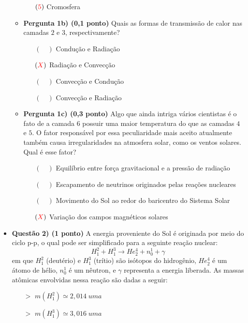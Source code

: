 \documentclass[a4paper, 12pt]{article}
\newcommand{\red}[1]{\textcolor{red}{#1}}
\begin{document}
\begin{flushleft}
\begin{itemize}
\begin{itemize}
\begin{multicols}{2}
\begin{itemize}
						\item[$(\red{5})$] Cromosfera
					\end{itemize} \end{multicols}
				\item \textbf{Pergunta 1b) (0,1 ponto)} Quais as formas de transmissão de calor nas camadas $2$ e $3$, respectivamente?
					\begin{itemize}
						\item[$(\quad)$] Condução e Radiação
						\item[$(\red{X})$] Radiação e Convecção
						\item[$(\quad)$] Convecção e Condução
						\item[$(\quad)$] Convecção e Radiação
					\end{itemize}
				\item \textbf{Pergunta 1c) (0,3 ponto)} Algo que ainda intriga vários cientistas é o fato de a camada $6$ possuir uma maior temperatura do que as camadas $4$ e $5$. O fator responsável por essa peculiaridade mais aceito atualmente também causa irregularidades na atmosfera solar, como os ventos solares. Qual é esse fator?
					\begin{itemize}
						\item[$(\quad)$] Equilíbrio entre força gravitacional e a pressão de radiação
						\item[$(\quad)$] Escapamento de neutrinos originados pelas reações nucleares
						\item[$(\quad)$] Movimento do Sol ao redor do baricentro do Sistema Solar
						\item[$(\red{X})$] Variação dos campos magnéticos solares
					\end{itemize}
			\end{itemize}
		\item \textbf{Questão 2) (1 ponto)} A energia proveniente do Sol é originada por meio do ciclo p-p, o qual pode ser simplificado para a seguinte reação nuclear:
			$$H_1^2 + H_1^3 \longrightarrow He_2^4 + n_0^1 + \gamma$$
			em que $H_1^2$ (deutério) e $H_1^3$ (trítio) são isótopos do hidrogênio, $He_2^4$ é um átomo de hélio, $n_0^1$ é um nêutron, e $\gamma$ representa a energia liberada. \linebreak
			As massas atômicas envolvidas nessa reação são dadas a seguir:
				\begin{multicols}{2} \begin{itemize}
					\item[$>$] $m(H_1^2) \simeq 2,014 \; uma$
					\item[$>$] $m(H_1^3) \simeq 3,016 \; uma$

\end{itemize}
\end{multicols}
\end{itemize}
\end{flushleft}
\end{document}
